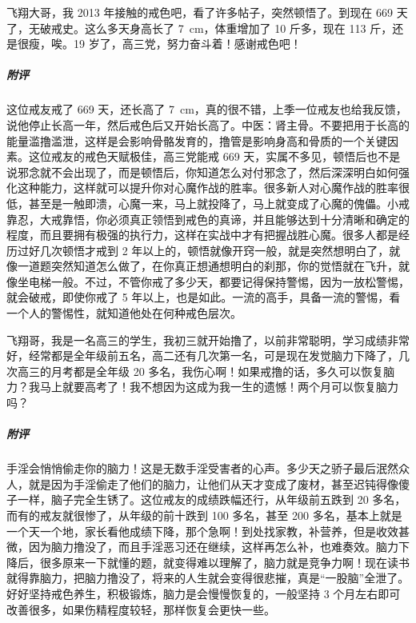 \begin{case}
    飞翔大哥，我 2013 年接触的戒色吧，看了许多帖子，突然顿悟了。到现在 669 天了，无破戒史。这么多天身高长了 \SI{7}{\centi\metre}，体重增加了 10 斤多，现在 113 斤，还是很瘦，唉。19 岁了，高三党，努力奋斗着！感谢戒色吧！
    \subparagraph{附评} 这位戒友戒了 669 天，还长高了 \SI{7}{\centi\metre}，真的很不错，上季一位戒友也给我反馈，说他停止长高一年，然后戒色后又开始长高了。中医：肾主骨。不要把用于长高的能量滥撸滥泄，这样是会影响骨骼发育的，撸管是影响身高和骨质的一个关键因素。这位戒友的戒色天赋极佳，高三党能戒 669 天，实属不多见，顿悟后也不是说邪念就不会出现了，而是顿悟后，你知道怎么对付邪念了，然后深深明白如何强化这种能力，这样就可以提升你对心魔作战的胜率。很多新人对心魔作战的胜率很低，甚至是一触即溃，心魔一来，马上就投降了，马上就变成了心魔的傀儡。小戒靠忍，大戒靠悟，你必须真正领悟到戒色的真谛，并且能够达到十分清晰和确定的程度，而且要拥有极强的执行力，这样在实战中才有把握战胜心魔。很多人都是经历过好几次顿悟才戒到 2 年以上的，顿悟就像开窍一般，就是突然想明白了，就像一道题突然知道怎么做了，在你真正想通想明白的刹那，你的觉悟就在飞升，就像坐电梯一般。不过，不管你戒了多少天，都要记得保持警惕，因为一放松警惕，就会破戒，即使你戒了 5 年以上，也是如此。一流的高手，具备一流的警惕，看一个人的警惕性，就知道他处在何种戒色层次。
\end{case}

\begin{case}
    飞翔哥，我是一名高三的学生，我初三就开始撸了，以前非常聪明，学习成绩非常好，经常都是全年级前五名，高二还有几次第一名，可是现在发觉脑力下降了，几次高三的月考都是全年级 20 多名，我伤心啊！如果戒撸的话，多久可以恢复脑力？我马上就要高考了！我不想因为这成为我一生的遗憾！两个月可以恢复脑力吗？
    \subparagraph{附评} 手淫会悄悄偷走你的脑力！这是无数手淫受害者的心声。多少天之骄子最后泯然众人，就是因为手淫偷走了他们的脑力，让他们从天才变成了废材，甚至迟钝得像傻子一样，脑子完全生锈了。这位戒友的成绩跌幅还行，从年级前五跌到 20 多名，而有的戒友就很惨了，从年级的前十跌到 100 多名，甚至 200 多名，基本上就是一个天一个地，家长看他成绩下降，那个急啊！到处找家教，补营养，但是收效甚微，因为脑力撸没了，而且手淫恶习还在继续，这样再怎么补，也难奏效。脑力下降后，很多原来一下就懂的题，就变得难以理解了，脑力就是竞争力啊！现在读书就得靠脑力，把脑力撸没了，将来的人生就会变得很悲摧，真是“一股脑”全泄了。好好坚持戒色养生，积极锻炼，脑力是会慢慢恢复的，一般坚持 3 个月左右即可改善很多，如果伤精程度较轻，那样恢复会更快一些。
\end{case}

